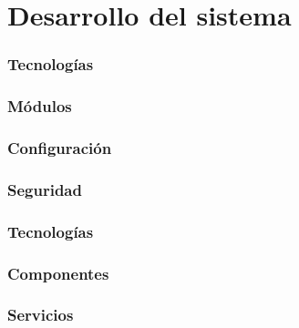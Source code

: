 \chapter{Desarrollo del sistema}
\label{chap:desarrollosistema}
\subsection{Tecnologías}
\subsection{Módulos}
\subsection{Configuración}
\subsection{Seguridad}
\subsection{Tecnologías}
\subsection{Componentes}
\subsection{Servicios}

